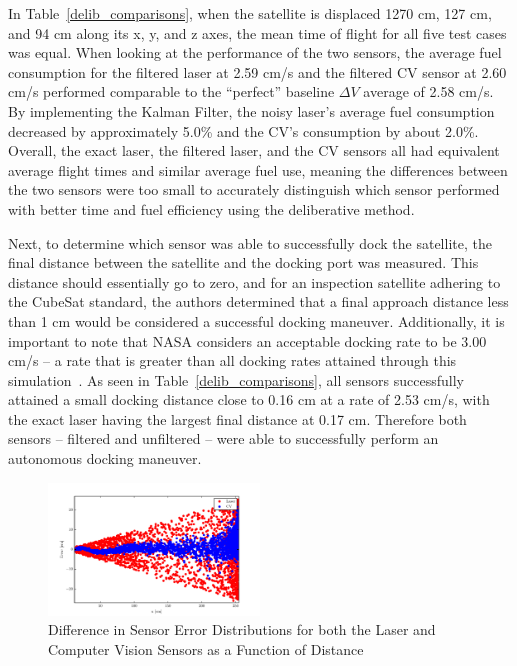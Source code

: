 \documentclass[journal, 10pt]{IEEEtran}
\begin{document}
In Table~\ref{delib_comparisons}, when the satellite is displaced 1270 cm, 127 cm, and 94 cm along its x, y, and z axes, the mean time of flight for all five test cases was equal. When looking at the performance of the two sensors, the average fuel consumption for the filtered laser at 2.59 cm/s and the filtered CV sensor at 2.60 cm/s performed comparable to the ``perfect'' baseline $\Delta V$ average of 2.58 cm/s. By implementing the Kalman Filter, the noisy laser's average fuel consumption decreased by approximately 5.0\% and the CV's consumption by about 2.0\%. Overall, the exact laser, the filtered laser, and the CV sensors all had equivalent average flight times and similar average fuel use, meaning the differences between the two sensors were too small to accurately distinguish which sensor performed with better time and fuel efficiency using the deliberative method.

Next, to determine which sensor was able to successfully dock the satellite, the final distance between the satellite and the docking port was measured. This distance should essentially go to zero, and for an inspection satellite adhering to the CubeSat standard, the authors determined that a final approach distance less than 1 cm would be considered a successful docking maneuver. Additionally, it is important to note that NASA considers an acceptable docking rate to be 3.00 cm/s -- a rate that is greater than all docking rates attained through this simulation~\cite{approachRate}. As seen in Table~\ref{delib_comparisons}, all sensors successfully attained a small docking distance close to 0.16 cm at a rate of 2.53 cm/s, with the exact laser having the largest final distance at 0.17 cm. Therefore both sensors -- filtered and unfiltered -- were able to successfully perform an autonomous docking maneuver.

\begin{figure}
\begin{center}
\includegraphics[width=0.5\textwidth]{figures/SensorErrors.pdf}
\caption{Difference in Sensor Error Distributions for both the Laser and Computer Vision Sensors as a Function of Distance}
\label{error}
\end{center}
\end{figure}
\end{document}
